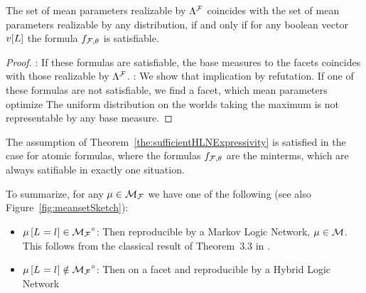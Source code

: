 \begin{theorem}\label{the:sufficientHLNExpressivity}
	The set of mean parameters realizable by $\Lambda^{\mathcal{F}}$ coincides with the set of mean parameters realizable by any distribution, if and only if for any boolean vector $v[L]$ the formula $f_{\mathcal{F},\theta}$ is satisfiable.
\end{theorem}
\begin{proof}
	\proofleftsymbol:
		If these formulas are satisfiable, the base measures to the facets coincides with those realizable by $\Lambda^{\mathcal{F}}$.
	\proofrightsymbol: 
		We show that implication by refutation.
		If one of these formulas are not satisfiable, we find a facet, which mean parameters optimize 
		The uniform distribution on the worlds taking the maximum is not representable by any base measure. 
\end{proof}

\begin{example}
	The assumption of Theorem~\ref{the:sufficientHLNExpressivity} is satisfied in the case for atomic formulas, where the formulas  $f_{\mathcal{F},\theta}$ are the minterms, which are always satifiable in exactly one situation.
\end{example}


To summarize, for any $\mu\in\mathcal{M}_{\mathcal{F}}$ we have one of the following (see also Figure~\ref{fig:meansetSketch}):
\begin{itemize}
	\item $\mu\left[L_{}=l_{}\right]\in{\mathcal{M}_{\mathcal{F}}}^{\circ}$: Then reproducible by a Markov Logic Network, $\mu\in\mathcal{M}$.
		This follows from the classical result of Theorem~3.3 in \cite{wainwright_graphical_2008}.
	\item  $\mu\left[L_{}=l_{}\right]\notin{\mathcal{M}_{\mathcal{F}}}^{\circ}$:
		Then on a facet and reproducible by a Hybrid Logic Network
\end{itemize}



